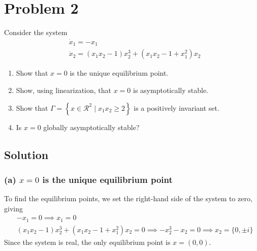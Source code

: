 \section*{Problem 2}

Consider the system
\begin{align*}
     &
    \dot{x}_{1}=-x_{1}
    \\ &
    \dot{x}_{2}=\left(x_{1} x_{2}-1\right) x_{2}^{3}+\left(x_{1} x_{2}-1+x_{1}^{2}\right) x_{2}
\end{align*}
\begin{enumerate}[label= (\alph*)]
    \item Show that \( x=0 \) is the unique equilibrium point.
    \item Show, using linearization, that \( x=0 \) is asymptotically stable.
    \item Show that \( \Gamma=\left \{ x \in \mathcal{R}^{2} \mid x_{1} x_{2} \geq 2\right \} \) is a positively invariant set.
    \item Is \( x=0 \) globally asymptotically stable?
\end{enumerate}

\subsection*{Solution}

\subsubsection*{(a) \( x=0 \) is the unique equilibrium point}

To find the equilibrium points, we set the right-hand side of the system to zero, giving
\begin{align*}
     &
    -x_1 = 0
    \implies
    x_1 = 0
    \\ &
    \left(x_{1} x_{2}-1\right) x_{2}^{3}+\left(x_{1} x_{2}-1+x_{1}^{2}\right) x_{2} = 0
    \implies
    - x_2^3 - x_2 = 0
    \implies
    x_2 = \{ 0, \pm i \}
\end{align*}
Since the system is real, the only equilibrium point is \( x = (0, 0) \).
